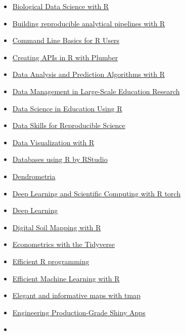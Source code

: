 \documentclass[
  letterpaper,
  DIV=11,
  numbers=noendperiod]{scrartcl}
\begin{document}
\begin{itemize}
  \href{https://www.uv.es/ayala/docencia/tami/tami13.pdf}{Bioinformática
  Estadística. Análisis estadístico de datos Ómicos}
\item
  \href{https://bdsr.stephenturner.us/}{Biological Data Science with R}
\item
  \href{https://raps-with-r.dev/}{Building reproducible analytical
  pipelines with R}
\item
  \href{https://bash-intro.rsquaredacademy.com/}{Command Line Basics for
  R Users}
\item
  \href{https://www.rplumber.io/docs/index.html}{Creating APIs in R with
  Plumber}
\item
  \href{http://rafalab.dfci.harvard.edu/dsbook/}{Data Analysis and
  Prediction Algorithms with R}
\item
  \href{https://datamgmtinedresearch.com/}{Data Management in
  Large-Scale Education Research}
\item
  \href{https://datascienceineducation.com/}{Data Science in Education
  Using R}
\item
  \href{https://psyteachr.github.io/msc-data-skills/}{Data Skills for
  Reproducible Science}
\item
  \href{https://rkabacoff.github.io/datavis/}{Data Visualization with R}
\item
  \href{https://db.rstudio.com/getting-started/}{Databases using R by
  RStudio}
\item
  \href{https://gitlab.com/Puletti/dendrometria_libro}{Dendrometria}
\item
  \href{https://skeydan.github.io/Deep-Learning-and-Scientific-Computing-with-R-torch/}{Deep
  Learning and Scientific Computing with R torch}
\item
  \href{https://srdas.github.io/DLBook/}{Deep Learning}
\item
  \href{https://zia207.quarto.pub/}{Digital Soil Mapping with R}
\item
  \href{https://colleen.quarto.pub/the-tidy-econometrics-workbook/}{Econometrics
  with the Tidyverse}
\item
  \href{https://csgillespie.github.io/efficientR/}{Efficient R
  programming}
\item
  \href{https://emlwr.org/}{Efficient Machine Learning with R}
\item
  \href{https://r-tmap.github.io/tmap-book/}{Elegant and informative
  maps with tmap}
\item
  \href{https://engineering-shiny.org/}{Engineering Production-Grade
  Shiny Apps}
\item

\end{itemize}
\end{document}
